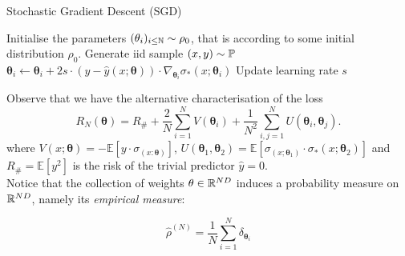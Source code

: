 \documentclass{article}
\begin{document}
\newpage
\begin{codeblock}{Stochastic Gradient Descent (SGD)}\label{alg: SGD}
\begin{algorithmic}
\State Initialise the parameters $(\mathbf{\theta}_{i})_{i\leq \mathbb{N}} \sim \rho_{0}$, that is according to some initial distribution $ \rho_{0}$.
\State Generate iid sample $ (x, y)\sim \mathbb{P}$
\State $\mathbf{\theta}_{i}\gets\mathbf{\theta}_{i}+2s\cdot (y-\hat{y}(x;\mathbf{\theta}))\cdot \nabla_{\mathbf{\theta}_{i}}\sigma_{*}(x;\mathbf{\theta}_i)$ 
\State Update learning rate $ s$
\EndFor
\EndWhile
\end{algorithmic}

\end{codeblock}

Observe that we have the alternative characterisation of the loss
\begin{equation}\label{eq: loss expanded}
	R_{N}(\mathbf{\theta}) = R_{\#}+ \frac{2}{N}\displaystyle\sum^{N}_{i=1}V(\mathbf{\theta}_{i})+\frac{1}{N^{2}}\displaystyle\sum^{N}_{i,j=1}U(\mathbf{\theta}_{i},\mathbf{\theta}_{j}).
\end{equation} 
where $ V(x; \mathbf{\theta}) = -\mathbb{E}[y\cdot \sigma_(x: \mathbf{\theta})]$, $ U( \mathbf{\theta}_{1}, \mathbf{\theta}_{2}) =\mathbb{E}[\sigma_(x; \mathbf{\theta}_{1})\cdot \sigma_*(x; \mathbf{\theta}_{2})]$ and $ R_{\#}=\mathbb{E}[y^{2}]$ is the risk of the trivial predictor $ \hat{y} = 0$.\\ 

Notice that the collection of weights $  \mathbf{\theta}\in \mathbb{R}^{ND}$ induces a probability measure on $ \mathbb{R}^{ND}$, namely its \textit{empirical measure}:

\begin{equation}\label{eq: empirical measure}
	\hat{\rho}^{(N)} = \frac{1}{N}\displaystyle\sum^{N}_{i=1}\delta_{ \mathbf{\theta}_{i}} 
\end{equation}
\end{document}
